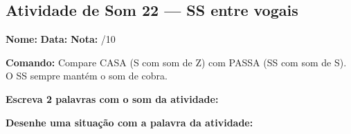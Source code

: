 \subsection{Atividade de Som 22 --- SS entre vogais}
\begin{exercicio}



\noindent\textbf{Nome:} \underline{\hspace{3.2cm}} \quad \textbf{Data:} \underline{\hspace{1.6cm}} \quad \textbf{Nota:} \underline{\hspace{0.9cm}}/10


\noindent\textbf{Comando:} Compare CASA (S com som de Z) com PASSA (SS com som de S). O SS sempre mantém o som de cobra.


\begin{center}
\end{center}

\noindent\textbf{Escreva 2 palavras com o som da atividade:}

\begin{center}
  \underline{\hspace{3cm}} \quad \underline{\hspace{3cm}}
\end{center}

\noindent\textbf{Desenhe uma situação com a palavra da atividade:}

\begin{center}
\end{center}

\end{exercicio}




